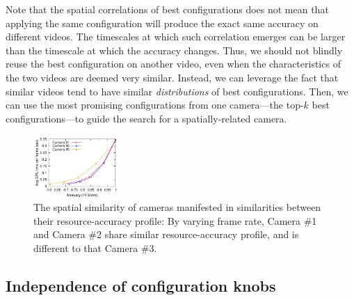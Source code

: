 Note that the spatial correlations of best configurations does not mean that applying the same configuration will produce the exact same accuracy on different videos. The timescales at which such correlation emerges can be larger than the timescale at which the accuracy changes. Thus, we should not blindly reuse the best configuration on another video, even when the characteristics of the two videos are deemed very similar. Instead, we can leverage the fact that similar videos tend to have similar {\em distributions} of best configurations. Then, we can use the most promising configurations from one camera---\eg the top-$k$ best configurations---to guide the search for a spatially-related camera. 


\begin{figure}
    \centering
    \includegraphics[width=0.3\textwidth]{PaperGraphs/CrossCamera_profiles.pdf}
    \caption{The spatial similarity of cameras manifested in similarities between their resource-accuracy profile: By varying frame rate, Camera \#1 and Camera \#2 share similar resource-accuracy profile, and is different to that Camera \#3.}
    \label{fig:cross-camera}
\end{figure}


\subsection{Independence of configuration knobs}
\label{subsec:independence}


